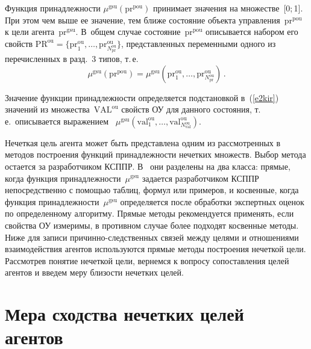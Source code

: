 \begin{multicols}{2}
  \smallskip

  Функция принадлежности $\mu^{\mathrm{gsu}}(\mathrm{pr}^{\mathrm{pou}})$ принимает значения на 
множестве~[0;\,1]. При этом чем выше ее значение, тем ближе состояние 
объекта управления~$\mathrm{pr}^{\mathrm{pou}}$ к цели агента~$\mathrm{pr}^{\mathrm{gsu}}$. В~общем случае 
состояние~$\mathrm{pr}^{\mathrm{pou}}$ описывается набором его свойств $\mathrm{PR}^{\mathrm{ou}} 
=\{\mathrm{pr}_1^{\mathrm{ou}}, \ldots , \mathrm{pr}^{\mathrm{ou}}_{N_{\mathrm{pr}}^{\mathrm{ou}}}\}$, 
представленных переменными 
одного из перечисленных в разд.~3 типов, т.\,е.
  \begin{equation}
  \mu^{\mathrm{gsu}} (\mathrm{pr}^{\mathrm{pou}}) = \mu^{\mathrm{gsu}}(\mathrm{pr}_1^{\mathrm{ou}}, \ldots , 
\mathrm{pr}^{\mathrm{ou}}_{N_{\mathrm{pr}}^{\mathrm{ou}}})\,.
  \label{e2kir}
  \end{equation}
  
  Значение функции принадлежности определяется подстановкой 
в~(\ref{e2kir}) значений из множества~$\mathrm{VAL}^{\mathrm{ou}}$ свойств ОУ для данного 
состояния, т.\,е.\ описывается выражением ~$\mu^{\mathrm{gsu}} (\mathrm{val}_1^{\mathrm{ou}},\ldots , 
\mathrm{val}^{\mathrm{ou}}_{N^{\mathrm{ou}}_{\mathrm{val}}})$.
  
  Нечеткая цель агента может быть представлена одним из рассмотренных 
в~\cite{14kir} методов по\-стро\-ения функций принадлежности нечетких 
множеств. Выбор метода остается за разработчиком \mbox{КСППР}. В~\cite{14kir} они 
разделены на два класса: прямые, когда функция принадлежности~$\mu^{\mathrm{gsu}}$ 
задается разработчиком \mbox{КСППР} непосредственно с помощью таб\-лиц, формул 
или примеров, и косвенные, когда функция принадлежности~$\mu^{\mathrm{gsu}}$ 
определяется после обработки экспертных оценок по определенному 
алгоритму. Прямые методы рекомендуется применять, если свойства ОУ 
измеримы, в противном случае более подходят косвенные методы. Ниже для 
записи причинно-следственных связей между целями и отношениями 
взаимодействия агентов используются прямые методы построения нечеткой 
цели. Рассмотрев понятие нечеткой цели, вернемся к вопросу сопоставления 
целей агентов и введем меру близости нечетких целей.
  
\section{Мера сходства нечетких целей агентов}
  

\end{multicols}
